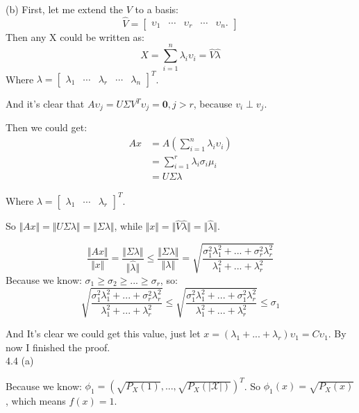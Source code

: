 \documentclass[a4paper]{article}
\begin{document}
(b) First, let me extend the $V$ to a basis:
$$
\hat V = \begin{bmatrix}
\upsilon_1 & \cdots& \upsilon_r &\cdots & \upsilon_n.
\end{bmatrix}
$$
Then any X could be written as:
$$
X = \sum_{i=1}^n \lambda_i \upsilon_i = \hat V \hat\lambda
$$
Where $\lambda = \begin{bmatrix}
\lambda_1&\cdots&\lambda_r &\cdots& \lambda_n
\end{bmatrix}^T$.

And it's clear that $A\upsilon_j =U \Sigma V^T\upsilon_j =  \mathbf{0},j> r$, because $v_i \perp v_j$.

Then we could get:
$$
\begin{aligned}
Ax &= A( \sum_{i=1}^n \lambda_i \upsilon_i)\\
&= \sum_{i=1}^r \lambda_i\sigma_i\mu_i\\
&= U\Sigma\lambda
\end{aligned}
$$

Where $\lambda = \begin{bmatrix}
\lambda_1&\cdots&\lambda_r
\end{bmatrix}^T$.

So $\Vert Ax\Vert = \Vert U\Sigma\lambda \Vert = \Vert \Sigma\lambda \Vert$, while $\Vert x\Vert = \Vert \hat V \hat \lambda\Vert = \Vert \hat \lambda \Vert$.

$$
\frac{\Vert Ax\Vert}{\Vert x\Vert}=\frac{\Vert\Sigma\lambda\Vert}{ \Vert \hat \lambda \Vert} \leq \frac{\Vert\Sigma\lambda\Vert}{ \Vert\lambda \Vert} =\sqrt{\frac{\sigma_1^2\lambda_1^2+...+\sigma_r^2\lambda_r^2}{\lambda_1^2 + ... + \lambda_r^2}}
$$
Because we know: $\sigma_1 \ge \sigma_2 \ge ... \ge \sigma_r$, so:
$$
\sqrt{\frac{\sigma_1^2\lambda_1^2+...+\sigma_r^2\lambda_r^2}{\lambda_1^2 + ... + \lambda_r^2}} \leq \sqrt{\frac{\sigma_1^2\lambda_1^2+...+\sigma_1^2\lambda_r^2}{\lambda_1^2 + ... + \lambda_r^2}}\leq \sigma_1
$$

And It's clear we could get this value, just let $x = (\lambda_1+...+\lambda_r)\upsilon_1 = C\upsilon_1$.
By now I finished the proof.
$$$$
4.4 (a)

Because we know:
$\phi_1 = (\sqrt{P_X(1)},...,\sqrt{P_X(\vert \mathcal{X}\vert)})^T$. 
So $\phi_1(x) = \sqrt{P_X(x)}$, which means $f(x) = 1$.
\end{document}
